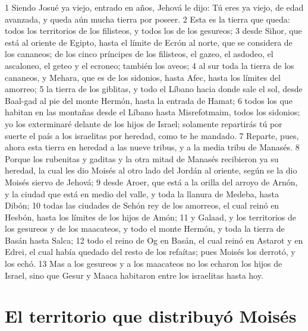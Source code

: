 1 Siendo Josué ya viejo, entrado en años, Jehová le dijo: Tú eres ya viejo, de edad avanzada, y queda aún mucha tierra por poseer.
2 Esta es la tierra que queda: todos los territorios de los filisteos, y todos los de los gesureos;
3 desde Sihor, que está al oriente de Egipto, hasta el límite de Ecrón al norte, que se considera de los cananeos; de los cinco príncipes de los filisteos, el gazeo, el asdodeo, el ascaloneo, el geteo y el ecroneo; también los aveos;
4 al sur toda la tierra de los cananeos, y Mehara, que es de los sidonios, hasta Afec, hasta los límites del amorreo;
5 la tierra de los giblitas, y todo el Líbano hacia donde sale el sol, desde Baal-gad al pie del monte Hermón, hasta la entrada de Hamat;
6 todos los que habitan en las montañas desde el Líbano hasta Misrefotmaim, todos los sidonios; yo los exterminaré delante de los hijos de Israel; solamente repartirás tú por suerte el país a los israelitas por heredad, como te he mandado.
7 Reparte, pues, ahora esta tierra en heredad a las nueve tribus, y a la media tribu de Manasés.
8 Porque los rubenitas y gaditas y la otra mitad de Manasés recibieron ya su heredad, la cual les dio Moisés al otro lado del Jordán al oriente, según se la dio Moisés siervo de Jehová;
9 desde Aroer, que está a la orilla del arroyo de Arnón, y la ciudad que está en medio del valle, y toda la llanura de Medeba, hasta Dibón;
10 todas las ciudades de Sehón rey de los amorreos, el cual reinó en Hesbón, hasta los límites de los hijos de Amón;
11 y Galaad, y los territorios de los gesureos y de los maacateos, y todo el monte Hermón, y toda la tierra de Basán hasta Salca;
12 todo el reino de Og en Basán, el cual reinó en Astarot y en Edrei, el cual había quedado del resto de los refaítas; pues Moisés los derrotó, y los echó.
13 Mas a los gesureos y a los maacateos no los echaron los hijos de Israel, sino que Gesur y Maaca habitaron entre los israelitas hasta hoy.

\section*{El territorio que distribuyó Moisés}

